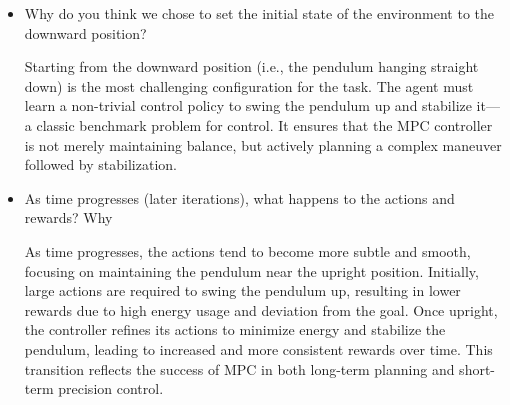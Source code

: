 \begin{itemize}
    \item Why do you think we chose to set the initial state of the environment to the downward position? 
    
    Starting from the downward position (i.e., the pendulum hanging straight down) is the most challenging configuration for the task. The agent must learn a non-trivial control policy to swing the pendulum up and stabilize it—a classic benchmark problem for control. It ensures that the MPC controller is not merely maintaining balance, but actively planning a complex maneuver followed by stabilization.
    
    \item As time progresses (later iterations), what happens to the actions and rewards? Why

    As time progresses, the actions tend to become more subtle and smooth, focusing on maintaining the pendulum near the upright position. Initially, large actions are required to swing the pendulum up, resulting in lower rewards due to high energy usage and deviation from the goal. Once upright, the controller refines its actions to minimize energy and stabilize the pendulum, leading to increased and more consistent rewards over time. This transition reflects the success of MPC in both long-term planning and short-term precision control.

\end{itemize}
